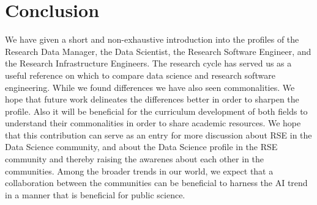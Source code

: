 \documentclass[
        english,biblatex
    ]{lni}
\begin{document}
    \section{Conclusion}\label{conclusion}

    We have given a short and non-exhaustive introduction into the
    profiles of the Research Data Manager, the Data Scientist, the
    Research Software Engineer, and the Research Infrastructure
    Engineers. The research cycle has served us as a useful reference on
    which to compare data science and research software engineering.
    While we found differences we have also seen commonalities. We hope
    that future work delineates the differences better in order to
    sharpen the profile. Also it will be beneficial for the curriculum
    development of both fields to understand their commonalities in
    order to share academic resources. We hope that this contribution
    can serve as an entry for more discussion about RSE in the Data
    Science community, and about the Data Science profile in the RSE
    community and thereby raising the awarenes about each other in the
    communities. Among the broader trends in our world, we expect that a
    collaboration between the communities can be beneficial to harness
    the AI trend in a manner that is beneficial for public science.

    \printbibliography

\end{document}
